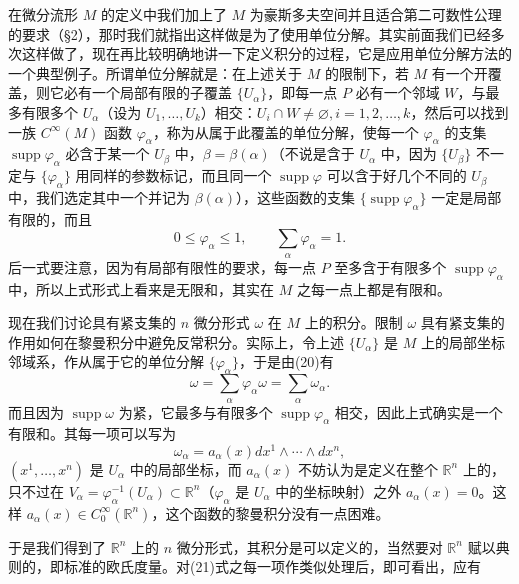 在微分流形 $M$ 的定义中我们加上了 $M$ 为豪斯多夫空间并且适合第二可数性公理的要求（§2），那时我们就指出这样做是为了使用单位分解。其实前面我们已经多次这样做了，现在再比较明确地讲一下定义积分的过程，它是应用单位分解方法的一个典型例子。所谓单位分解就是：在上述关于 $M$ 的限制下，若 $M$ 有一个开覆盖，则它必有一个局部有限的子覆盖 $\{U_\alpha\}$，即每一点 $P$ 必有一个邻域 $W$，与最多有限多个 $U_\alpha$（设为 $U_1,\ldots,U_k$）相交：$U_i\cap W\ne\varnothing,i=1,2,\ldots,k$，然后可以找到一族 $C^\infty(M)$ 函数 $\varphi_\alpha$，称为从属于此覆盖的单位分解，使每一个 $\varphi_\alpha$ 的支集 $\operatorname{supp}\varphi_\alpha$ 必含于某一个 $U_\beta$ 中，$\beta=\beta(\alpha)$（不说是含于 $U_\alpha$ 中，因为 $\{U_\beta\}$ 不一定与 $\{\varphi_\alpha\}$ 用同样的参数标记，而且同一个 $\operatorname{supp}\varphi$ 可以含于好几个不同的 $U_\beta$ 中，我们选定其中一个并记为 $\beta(\alpha)$），这些函数的支集 $\{\operatorname{supp}\varphi_\alpha\}$ 一定是局部有限的，而且
\begin{equation}
 0\le\varphi_\alpha\le1,\qquad \sum_\alpha\varphi_\alpha=1.
 \tag{20}
\end{equation}
后一式要注意，因为有局部有限性的要求，每一点 $P$ 至多含于有限多个 $\operatorname{supp}\varphi_\alpha$ 中，所以上式形式上看来是无限和，其实在 $M$ 之每一点上都是有限和。

现在我们讨论具有紧支集的 $n$ 微分形式 $\omega$ 在 $M$ 上的积分。限制 $\omega$ 具有紧支集的作用如何在黎曼积分中避免反常积分。实际上，令上述 $\{U_\alpha\}$ 是 $M$ 上的局部坐标邻域系，作从属于它的单位分解 $\{\varphi_\alpha\}$，于是由(20)有
\begin{equation}
 \omega=\sum_\alpha\varphi_\alpha\omega=\sum_\alpha\omega_\alpha.
 \tag{21}
\end{equation}
而且因为 $\operatorname{supp}\omega$ 为紧，它最多与有限多个 $\operatorname{supp}\varphi_\alpha$ 相交，因此上式确实是一个有限和。其每一项可以写为
\begin{equation}
 \omega_\alpha=a_\alpha(x)dx^1\wedge\cdots\wedge dx^n,
 \tag{22}
\end{equation}
$(x^1,\ldots,x^n)$ 是 $U_\alpha$ 中的局部坐标，而 $a_\alpha(x)$ 不妨认为是定义在整个 $\mathbb R^n$ 上的，只不过在 $V_\alpha=\varphi_\alpha^{-1}(U_\alpha)\subset\mathbb R^n$（$\varphi_\alpha$ 是 $U_\alpha$ 中的坐标映射）之外 $a_\alpha(x)=0$。这样 $a_\alpha(x)\in C_0^\infty(\mathbb R^n)$，这个函数的黎曼积分没有一点困难。

于是我们得到了 $\mathbb R^n$ 上的 $n$ 微分形式，其积分是可以定义的，当然要对 $\mathbb R^n$ 赋以典则的，即标准的欧氏度量。对(21)式之每一项作类似处理后，即可看出，应有

